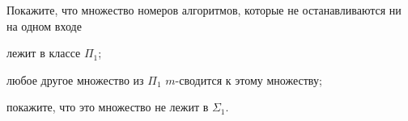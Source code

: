 Покажите, что множество номеров алгоритмов, которые не останавливаются ни на одном входе
\begin{enumcyr}
    \item лежит в классе $\Pi_1$;
    \item любое другое множество из $\Pi_1$ $m$-сводится к этому множеству;
    \item покажите, что это множество не лежит в $\Sigma_1$.
\end{enumcyr}